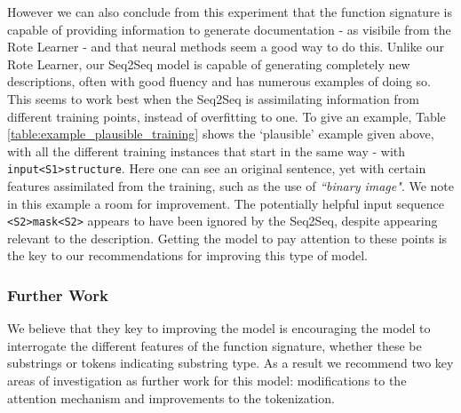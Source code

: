 However we can also conclude from this experiment that the function signature is capable of providing information to generate documentation - as visibile from the Rote Learner - and that neural methods seem a good way to do this.
Unlike our Rote Learner, our Seq2Seq model is capable of generating completely new descriptions, often with good fluency and has numerous examples of doing so. This seems to work best when the Seq2Seq is assimilating information from different training points, instead of overfitting to one. 
To give an example, Table \ref{table:example_plausible_training} shows the `plausible' example given above, with all the different training instances that start in the same way - with \texttt{input<S1>structure}. 
Here one can see an original sentence, yet with certain features assimilated from the training, such as the use of \textit{``binary image"}. We note in this example a room for improvement. The potentially helpful input sequence \texttt{<S2>mask<S2>} appears to have been ignored by the Seq2Seq, despite appearing relevant to the description. 
Getting the model to pay attention to these points is the key to our recommendations for improving this type of model.

\subsubsection{Further Work}

We believe that they key to improving the model is encouraging the model to interrogate the different features of the function signature, whether these be substrings or tokens indicating substring type.
As a result we recommend two key areas of investigation as further work for this model: modifications to the attention mechanism and improvements to the tokenization. 


